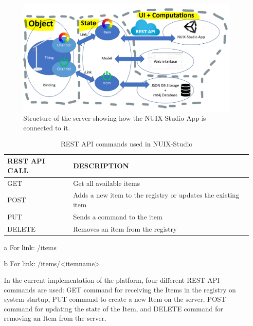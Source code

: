\begin{figure}
  \centering
  \includegraphics[width=0.9\linewidth]{figures/ExtendedServerStructure.png}
  \caption{Structure of the server showing how the NUIX-Studio App is connected to it.}
  \label{fig:ExtendedServerStructure-figure}
\end{figure}

\begin{table}
  \centering
  \begin{threeparttable}[c]
    \caption{REST API commands used in NUIX-Studio}
    \label{tab:rest-api-table}
    \begin{tabular}{ll}
      \toprule
      REST API CALL    &         DESCRIPTION                 \\
      \midrule
      GET\tnote{a} & Get all available items \\
      POST\tnote{b} & Adds a new item to the registry or updates the existing item    \\
      PUT\tnote{b}        & Sends a command to the item                              \\
      DELETE\tnote{b}        & Removes an item from the registry          \\
      \bottomrule
    \end{tabular}
    \begin{tablenotes}
      \item [a] For link: /items
      \item [b] For link: /items/<itemname>
    \end{tablenotes}
  \end{threeparttable}
\end{table}

In the current implementation of the platform, four different REST API commands are used: GET command for receiving the Items in the registry on system startup, PUT command to create a new Item on the server, POST command for updating the state of the Item, and DELETE command for removing an Item from the server.

